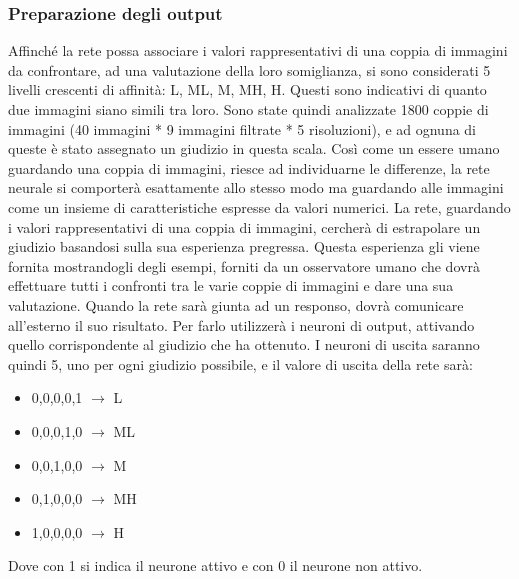 \documentclass[a4paper,11pt]{article}
\begin{document}
    \subsubsection{Preparazione degli output}
    Affinché la rete possa associare i valori rappresentativi di una coppia di immagini da confrontare, 
    ad una valutazione della loro somiglianza, si sono considerati 5 livelli crescenti di affinità: L, ML, M, MH, H. Questi sono indicativi di quanto due immagini siano simili tra loro.
    Sono state quindi analizzate 1800 coppie di immagini (40 immagini * 9 immagini filtrate * 5 risoluzioni), e ad ognuna di queste
    è stato assegnato un giudizio in questa scala.
    Così come un essere umano guardando una coppia di immagini, riesce ad individuarne le differenze, la rete neurale si comporterà esattamente allo stesso modo ma 
    guardando alle immagini come un insieme di caratteristiche espresse da valori numerici.
    La rete, guardando i valori rappresentativi di una coppia di immagini, cercherà di estrapolare un giudizio basandosi sulla sua esperienza pregressa.
    Questa esperienza gli viene fornita mostrandogli degli esempi, forniti da un osservatore umano che dovrà effettuare tutti i confronti tra le varie coppie di immagini e dare una sua valutazione.
    Quando la rete sarà giunta ad un responso, dovrà comunicare all'esterno il suo risultato. Per farlo utilizzerà i neuroni di output, attivando quello corrispondente al giudizio che ha ottenuto.
    I neuroni di uscita saranno quindi 5, uno per ogni giudizio possibile, e il valore di uscita della rete sarà:
    \begin{itemize}
        \item {0,0,0,0,1} $\rightarrow$ L 
        \item {0,0,0,1,0} $\rightarrow$ ML
        \item {0,0,1,0,0} $\rightarrow$ M
        \item {0,1,0,0,0} $\rightarrow$ MH
        \item {1,0,0,0,0} $\rightarrow$ H
    \end{itemize}
    Dove con 1 si indica il neurone attivo e con 0 il neurone non attivo.
    \newpage
\end{document}
